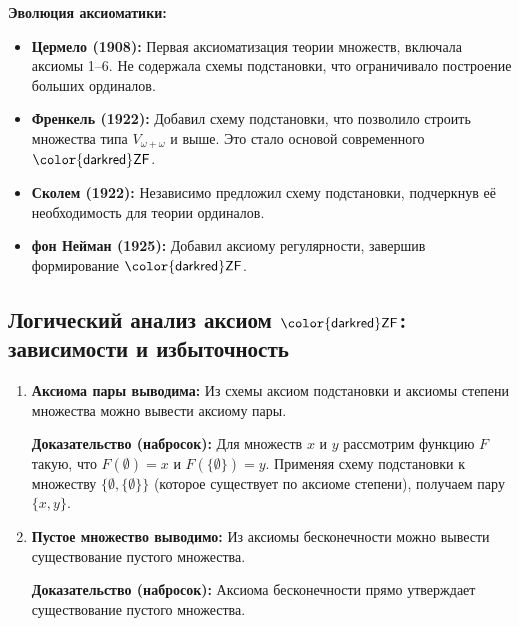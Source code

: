 \documentclass[11pt, a4paper]{extarticle}
\newcommand{\ZF}{\ifmmode \mathsf{\color{darkred}ZF}\else ${\mathsf{\color{darkred}ZF}}$\fi\xspace}
\begin{document}
\begin{remark}
\textbf{Эволюция аксиоматики:}
\begin{itemize}
    \item \textbf{Цермело (1908):} Первая аксиоматизация теории множеств, включала аксиомы 1--6. Не содержала схемы подстановки, что ограничивало построение больших ординалов.
    \item \textbf{Френкель (1922):} Добавил схему подстановки, что позволило строить множества типа $V_{\omega+\omega}$ и выше. Это стало основой современного \ZF.
    \item \textbf{Сколем (1922):} Независимо предложил схему подстановки, подчеркнув её необходимость для теории ординалов.
    \item \textbf{фон Нейман (1925):} Добавил аксиому регулярности, завершив формирование \ZF.
\end{itemize}
\end{remark}

\subsection{Логический анализ аксиом \ZF: зависимости и избыточность}

\quad 

\begin{theorem}\;
\begin{enumerate}
    \item \textbf{Аксиома пары выводима:} Из схемы аксиом подстановки и аксиомы степени множества можно вывести аксиому пары.
    
    \textbf{Доказательство (набросок):} Для множеств $x$ и $y$ рассмотрим функцию $F$ такую, что $F(\emptyset) = x$ и $F(\{\emptyset\}) = y$. Применяя схему подстановки к множеству $\{\emptyset, \{\emptyset\}\}$ (которое существует по аксиоме степени), получаем пару $\{x, y\}$.
    
    \item \textbf{Пустое множество выводимо:} Из аксиомы бесконечности можно вывести существование пустого множества.
    
    \textbf{Доказательство (набросок):} Аксиома бесконечности прямо утверждает существование пустого множества.
    
\end{enumerate}
\end{theorem}
\end{document}
